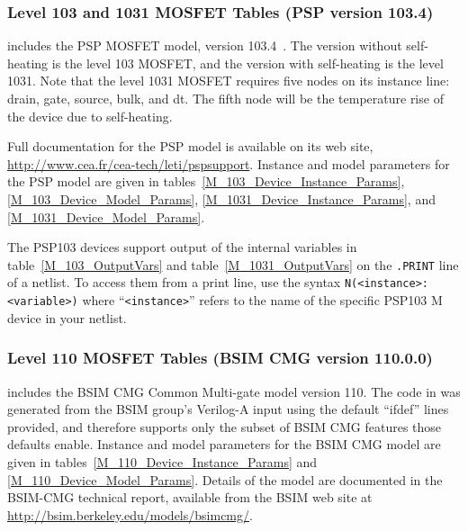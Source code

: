 



\subsubsection{Level 103 and 1031 MOSFET Tables (PSP version 103.4)}

\Xyce{} includes the PSP MOSFET model, version 103.4~\cite{PSP:2006}.
The version without self-heating is the level 103 MOSFET, and the
version with self-heating is the level 1031.  Note that the level 1031
MOSFET requires five nodes on its instance line: drain, gate, source,
bulk, and dt.  The fifth node will be the temperature rise of the
device due to self-heating.

Full documentation for the PSP model is available on its web site,
\url{http://www.cea.fr/cea-tech/leti/pspsupport}.  Instance and model
parameters for the PSP model are given in
tables~\ref{M_103_Device_Instance_Params}, \ref{M_103_Device_Model_Params},
\ref{M_1031_Device_Instance_Params}, and \ref{M_1031_Device_Model_Params}.

The PSP103 devices support output of the internal variables in
table~\ref{M_103_OutputVars} and table~\ref{M_1031_OutputVars} on the \texttt{.PRINT} line of a netlist.
To access them from a print line, use the syntax
\texttt{N(<instance>:<variable>)} where ``\texttt{<instance>}'' refers to the
name of the specific PSP103 M device in your netlist.








\clearpage
\subsubsection{Level 110 MOSFET Tables (BSIM CMG version 110.0.0)}
\Xyce{} includes the BSIM CMG Common Multi-gate model version 110.
The code in \Xyce{} was generated from the BSIM group's Verilog-A
input using the default ``ifdef'' lines provided, and therefore
supports only the subset of BSIM CMG features those defaults enable.
Instance and model parameters for the BSIM CMG model are given in
tables~\ref{M_110_Device_Instance_Params} and
\ref{M_110_Device_Model_Params}.  Details of the model are documented
in the BSIM-CMG technical report\cite{BSIMCMG:Manual}, available from
the BSIM web site at
\url{http://bsim.berkeley.edu/models/bsimcmg/}.

